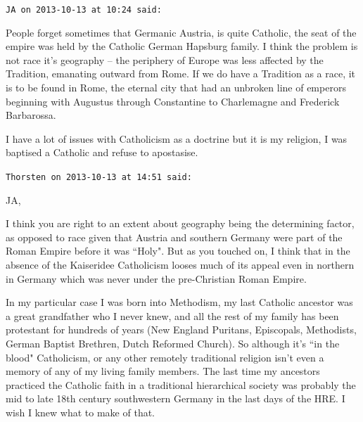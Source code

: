 \begin{footnotesize}
\begin{sffamily}
\hfill

\texttt{JA on 2013-10-13 at 10:24 said: }

People forget sometimes that Germanic Austria, is quite Catholic, the seat of the empire was held by the Catholic German
Hapsburg family. I think the problem is not race it's geography – the periphery of Europe was less
affected by the Tradition, emanating outward from Rome. If we do have a Tradition as a race, it is to be found in Rome,
the eternal city that had an unbroken line of emperors beginning with Augustus through Constantine to Charlemagne and
Frederick Barbarossa.

I have a lot of issues with Catholicism as a doctrine but it is my religion, I was baptised a Catholic and refuse to
apostasise.


\hfill

\texttt{Thorsten on 2013-10-13 at 14:51 said: }

JA,

I think you are right to an extent about geography being the determining factor, as opposed to race given that Austria
and southern Germany were part of the Roman Empire before it was ``Holy". But as you touched on, I think that in the
absence of the Kaiseridee Catholicism looses much of its appeal even in northern in Germany which was never under the
pre-Christian Roman Empire.

In my particular case I was born into Methodism, my last Catholic ancestor was a great grandfather who I never knew, and
all the rest of my family has been protestant for hundreds of years (New England Puritans, Episcopals, Methodists,
German Baptist Brethren, Dutch Reformed Church). So although it's ``in the blood" Catholicism, or
any other remotely traditional religion isn't even a memory of any of my living family members.
The last time my ancestors practiced the Catholic faith in a traditional hierarchical society was probably the mid to
late 18th century southwestern Germany in the last days of the HRE. I wish I knew what to make of that.


\end{sffamily}\end{footnotesize}
